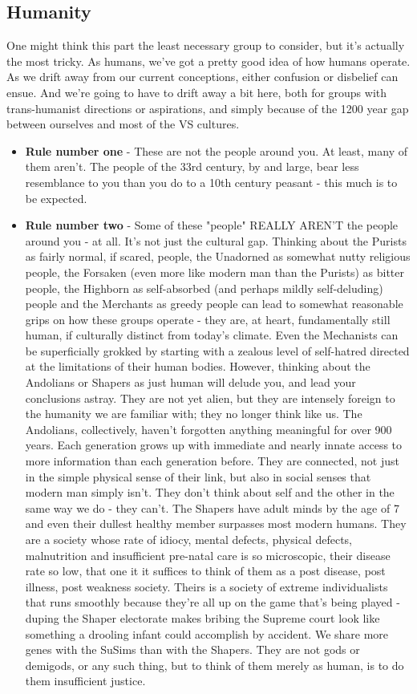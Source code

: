 \subsection{Humanity}

One might think this part the least necessary group to consider, but
it's actually the most tricky. As humans, we've got a pretty good idea
of how humans operate. As we drift away from our current conceptions,
either confusion or disbelief can ensue. And we're going to have to
drift away a bit here, both for groups with trans-humanist directions
or aspirations, and simply because of the 1200 year gap between
ourselves and most of the VS cultures.

\begin{itemize}
\item {\bf Rule number one} - These are not the people around you. At least, many
of them aren't. The people of the 33rd century, by and large, bear
less resemblance to you than you do to a 10th century peasant - this
much is to be expected.

\item {\bf Rule number two} - Some of these "people" REALLY AREN'T the
people around you - at all. It's not just the cultural gap. Thinking
about the Purists as fairly normal, if scared, people, the Unadorned
as somewhat nutty religious people, the Forsaken (even more like
modern man than the Purists) as bitter people, the Highborn as
self-absorbed (and perhaps mildly self-deluding) people and the
Merchants as greedy people can lead to somewhat reasonable grips on
how these groups operate - they are, at heart, fundamentally still
human, if culturally distinct from today's climate. Even the
Mechanists can be superficially grokked by starting with a zealous
level of self-hatred directed at the limitations of their human
bodies. However, thinking about the Andolians or Shapers as just human
will delude you, and lead your conclusions astray. They are not yet
alien, but they are intensely foreign to the humanity we are familiar
with; they no longer think like us. The Andolians, collectively,
haven't forgotten anything meaningful for over 900 years. Each
generation grows up with immediate and nearly innate access to more
information than each generation before. They are connected, not just
in the simple physical sense of their link, but also in social senses
that modern man simply isn't. They don't think about self and the
other in the same way we do - they can't. The Shapers have adult minds
by the age of 7 and even their dullest healthy member surpasses most
modern humans. They are a society whose rate of idiocy, mental
defects, physical defects, malnutrition and insufficient pre-natal care
is so microscopic, their disease rate so low, that one it it suffices
to think of them as a post disease, post illness, post weakness
society. Theirs is a society of extreme individualists that runs
smoothly because they're all up on the game that's being played -
duping the Shaper electorate makes bribing the Supreme court look like
something a drooling infant could accomplish by accident. We share
more genes with the SuSims than with the Shapers. They are not gods or
demigods, or any such thing, but to think of them merely as human, is
to do them insufficient justice.


\end{itemize}
